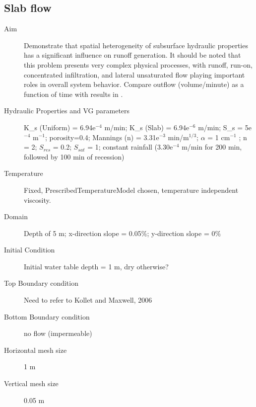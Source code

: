 \documentclass[twoside,10pt]{report}
\begin{document}
\subsection{Slab flow}
\begin{description}
\item [Aim] Demonstrate that spatial heterogeneity of subsurface hydraulic properties has a significant influence on runoff generation. It should be noted that this problem presents very complex physical processes, with runoff, run-on, concentrated infiltration, and lateral unsaturated flow playing important roles in overall system behavior. Compare outflow (volume/minute) as a function of time with results in \citet{Maxwell14a}.
\item [Hydraulic Properties and VG parameters] K_s (Uniform) = 6.94e$^{-4}$ m/min; K_s (Slab) = 6.94e$^{-6}$ m/min; S_s = 5e$^{-4}$ m$^{-1}$; porosity=0.4; Mannings (n) = 3.31e$^{-3}$ min/m$^{1/3}$; $\alpha$  = 1 cm$^{-1}$ ; n = 2; $S_{res}$ = 0.2; $S_{sat}$ = 1; constant rainfall (3.30e$^{-4}$ m/min for 200 min, followed by 100 min of recession)
\item [Temperature] Fixed, PrescribedTemperatureModel chosen, temperature independent viscosity.
\item [Domain] Depth of 5 m;  x-direction slope = 0.05$\%$; y-direction slope = 0$\%$
\item [Initial Condition] Initial water table depth = 1 m, dry otherwise?
\item [Top Boundary condition] Need to refer to Kollet and Maxwell, 2006
\item [Bottom Boundary condition] no flow (impermeable)
\item [Horizontal mesh size] 1 m
\item [Vertical mesh size] 0.05 m
\end{description}
\end{document}
